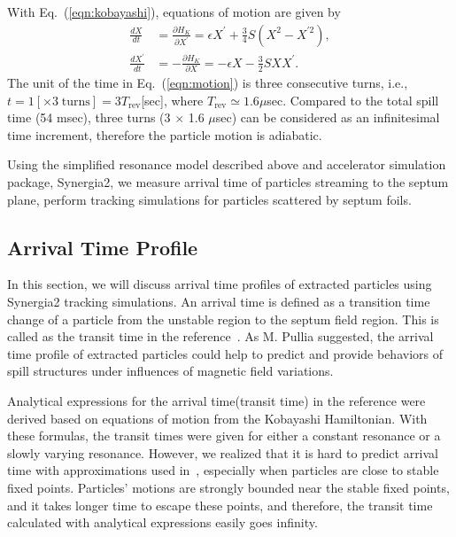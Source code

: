 \documentclass[aps,prstab,onecolumn,preprint]{revtex4-1}
\begin{document}
With Eq.~(\ref{eqn:kobayashi}), equations of motion are given by
\begin{equation}
 \begin{split}
  \frac{dX}{dt} & = \frac{\partial H_{K}}{\partial X^{\prime}}
                  = \epsilon X^{\prime} + \frac{3}{4} S
                    \left(
                      X^{2} - X^{\prime 2}
                    \right), \\
  \frac{dX^{\prime}}{dt} & = - \frac{\partial H_{K}}{\partial X}
                           = - \epsilon X - \frac{3}{2} S X X^{\prime}.
 \end{split}
\label{eqn:motion}
\end{equation}
The unit of the time in Eq.~(\ref{eqn:motion}) is three consecutive turns, i.e., $t = 1 [\times 3 \; \text{turns}] = 3 T_{\text{rev}}$[sec], where $T_{\text{rev}} \simeq 1.6 \mu$sec.
Compared to the total spill time (54 msec), three turns (3 $\times$ 1.6 $\mu$sec) can be considered as an infinitesimal time increment, therefore the particle motion is adiabatic. 

Using the simplified resonance model described above and accelerator simulation package, Synergia2, we measure arrival time of particles streaming to the septum plane, perform tracking simulations for particles scattered by septum foils.


\subsection{\label{sec:arrival}Arrival Time Profile}

In this section, we will discuss arrival time profiles of extracted particles using Synergia2 tracking simulations. An arrival time is defined as a transition time change of a particle from the unstable region to the septum field region. This is called as the transit time in the reference~\cite{pullia}. As M. Pullia suggested, the arrival time profile of extracted particles could help to predict and provide behaviors of spill structures under influences of magnetic field variations.

Analytical expressions for the arrival time(transit time) in the reference \cite{pullia} were derived based on equations of motion from the Kobayashi Hamiltonian. With these formulas, the transit times were given for either a constant resonance or a slowly varying resonance. However, we realized that it is hard to predict arrival time with approximations used in~\cite{pullia}, especially when particles are close to stable fixed points. Particles' motions are strongly bounded near the stable fixed points, and it takes longer time to escape these points, and therefore, the transit time calculated with analytical expressions easily goes infinity.
\end{document}
